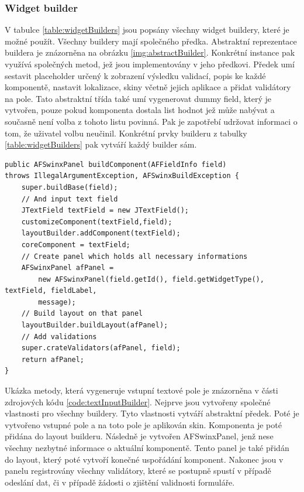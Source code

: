 \subsubsection{Widget builder}
V tabulce \ref{table:widgetBuilders} jsou popsány všechny widget buildery, které je možné použít. Všechny buildery mají společného předka. Abstraktní reprezentace buildera je znázorněna na obrázku \ref{img:abstractBuilder}. Konkrétní instance pak využívá společných metod, jež jsou implementovány v jeho předkovi. Předek umí sestavit placeholder určený k zobrazení výsledku validací, popis ke každé komponentě, nastavit lokalizace, skiny včetně jejich aplikace a přidat validátory na pole. Tato abstraktní třída také umí vygenerovat dummy field, který je vytvořen, pouze pokud komponenta dostala list hodnot jež může nabývat a současně není volba z tohoto listu povinná. Pak je zapotřebí udržovat informaci o tom, že uživatel volbu neučinil. Konkrétní prvky builderu z tabulky \ref{table:widgetBuilders} pak vytváří každý builder sám. 

\begin{lstlisting}[caption={Vytváření vstupního pole builderem.},
label={code:textInputBuilder}]
public AFSwinxPanel buildComponent(AFFieldInfo field) 
throws IllegalArgumentException, AFSwinxBuildException {
	super.buildBase(field);
	// And input text field
	JTextField textField = new JTextField();
	customizeComponent(textField,field);
	layoutBuilder.addComponent(textField);
	coreComponent = textField;
	// Create panel which holds all necessary informations
	AFSwinxPanel afPanel =
		new AFSwinxPanel(field.getId(), field.getWidgetType(), textField, fieldLabel,
		message);
	// Build layout on that panel
	layoutBuilder.buildLayout(afPanel);
	// Add validations
	super.crateValidators(afPanel, field);
	return afPanel;
}
\end{lstlisting}

Ukázka metody, která vygeneruje vstupní textové pole je znázorněna v části zdrojových kódu \ref{code:textInputBuilder}. Nejprve jsou vytvořeny společné vlastnosti pro všechny buildery. Tyto vlastnosti vytváří abstraktní předek. Poté je vytvořeno vstupné pole a na toto pole je aplikován skin. Komponenta je poté přidána do layout builderu. Následně je vytvořen AFSwinxPanel, jenž nese všechny nezbytné informace o aktuální komponentě. Tento panel je také přidán do layout, který poté vytvoří konečné uspořádání komponent. Nakonec jsou v panelu registrovány všechny validátory, které se postupně spustí v případě odeslání dat, či v případě žádosti o zjištění validnosti formuláře.


